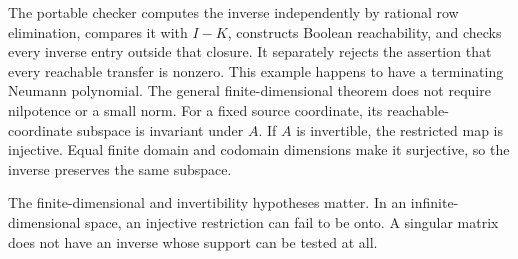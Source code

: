 The portable checker computes the inverse independently by rational row elimination, compares it with $I-K$, constructs Boolean reachability, and checks every inverse entry outside that closure. It separately rejects the assertion that every reachable transfer is nonzero.
This example happens to have a terminating Neumann polynomial. The general finite-dimensional theorem does not require nilpotence or a small norm. For a fixed source coordinate, its reachable-coordinate subspace is invariant under $A$. If $A$ is invertible, the restricted map is injective. Equal finite domain and codomain dimensions make it surjective, so the inverse preserves the same subspace.

The finite-dimensional and invertibility hypotheses matter. In an infinite-dimensional space, an injective restriction can fail to be onto. A singular matrix does not have an inverse whose support can be tested at all.

